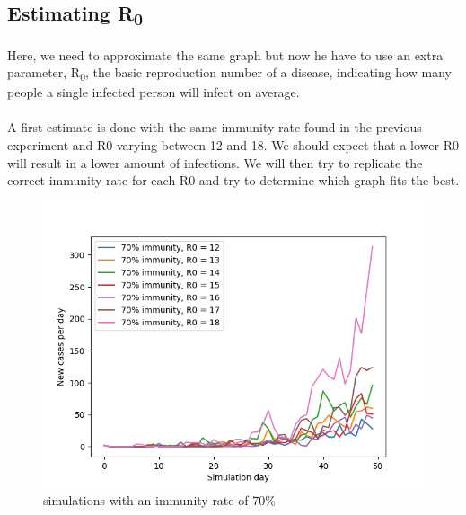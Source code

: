 \documentclass[runningheads]{llncs}
\begin{document}
\subsection{Estimating R\textsubscript{0}}
Here, we need to approximate the same graph but now he have to use an extra parameter, R\textsubscript{0}, the basic reproduction number of a disease, indicating how many people a single infected person will infect on average.
\\
\\
\noindent
A first estimate is done with the same immunity rate found in the previous experiment and R0 varying between 12 and 18. We should expect that a lower R0 will result in a lower amount of infections. We will then try to replicate the correct immunity rate for each R0 and try to determine which graph fits the best.

\begin{figure}
	\includegraphics[width=\textwidth]{test_R0_immunity_70.png}
	\caption{simulations with an immunity rate of 70\%}
\end{figure}
\end{document}
